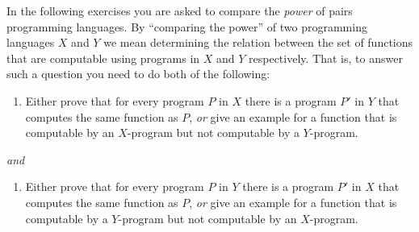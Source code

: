\hypertarget{usesugarex}{}

In the following exercises you are asked to compare the \emph{power} of
pairs programming languages. By ``comparing the power'' of two
programming languages \(X\) and \(Y\) we mean determining the relation
between the set of functions that are computable using programs in \(X\)
and \(Y\) respectively. That is, to answer such a question you need to
do both of the following:

\begin{enumerate}
\def\labelenumi{\arabic{enumi}.}
\tightlist
\item
  Either prove that for every program \(P\) in \(X\) there is a program
  \(P'\) in \(Y\) that computes the same function as \(P\), \emph{or}
  give an example for a function that is computable by an \(X\)-program
  but not computable by a \(Y\)-program.
\end{enumerate}

\emph{and}

\begin{enumerate}
\def\labelenumi{\arabic{enumi}.}
\tightlist
\item
  Either prove that for every program \(P\) in \(Y\) there is a program
  \(P'\) in \(X\) that computes the same function as \(P\), \emph{or}
  give an example for a function that is computable by a \(Y\)-program
  but not computable by an \(X\)-program.
\end{enumerate}

